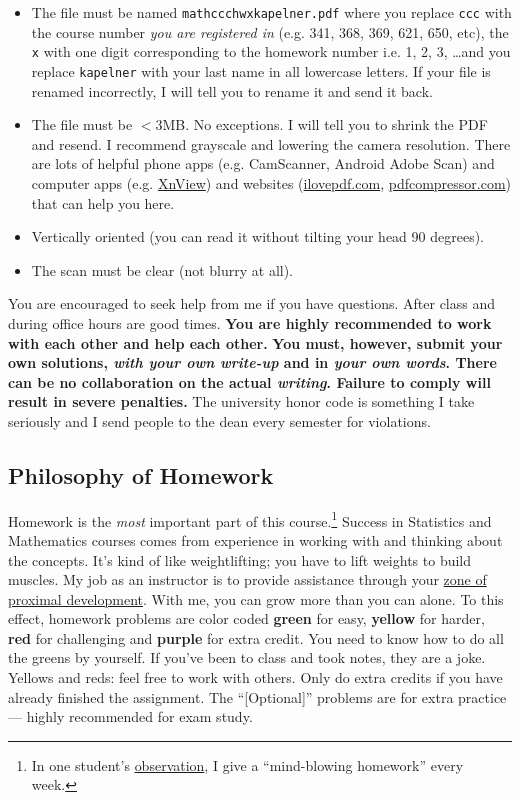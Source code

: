 \documentclass[12pt]{article}
\newcommand{\ingreen}[1]{\color{green}\textbf{#1} \color{black}}
\newcommand{\inyellow}[1]{\color{yellow}\textbf{#1} \color{black}}
\newcommand{\inred}[1]{\color{red}\textbf{#1} \color{black}}
\newcommand{\inpurple}[1]{\color{purple}\textbf{#1} \color{black}}
\newcommand{\pdfcompressiontext}{I recommend  grayscale and lowering the camera resolution. There are lots of helpful phone apps (e.g. CamScanner, Android Adobe Scan) and computer apps (e.g. \href{http://www.xnconvert.com/downloads}{XnView})  and websites (\url{ilovepdf.com}, \url{pdfcompressor.com}) that can help you here.}
\newcommand{\qu}[1]{``#1''}
\begin{document}
\begin{itemize}
\item The file must be named \texttt{mathccchwxkapelner.pdf} where you replace \texttt{ccc} with the course number \emph{you are registered in} (e.g. 341, 368, 369, 621, 650, etc), the \texttt{x} with one digit corresponding to the homework number i.e. 1, 2, 3, \ldots and you replace \texttt{kapelner} with your last name in all lowercase letters. If your file is renamed incorrectly, I will tell you to rename it and send it back.
\item The file must be $<$3MB. No exceptions. I will tell you to shrink the PDF and resend. \pdfcompressiontext
\item Vertically oriented (you can read it without tilting your head 90 degrees).
\item The scan must be clear (not blurry at all).
\end{itemize}

You are encouraged to seek help from me if you have questions. After class and during office hours are good times. \ingreen{You are highly recommended to work with each other and help each other.} \inred{You must, however, submit your own solutions, \textit{with your own write-up} and in \textit{your own words}. There can be no collaboration on the actual \textit{writing}. Failure to comply will result in severe penalties.} The university honor code is something I take seriously and I send people to the dean every semester for violations.


\subsection*{Philosophy of Homework}


Homework is the \textit{most} important part of this course.\footnote{In one student's \href{http://www.ratemyprofessors.com/ShowRatings.jsp?tid=1951051}{observation}, I give a \qu{mind-blowing homework} every week.} Success in Statistics and Mathematics courses comes from experience in working with and thinking about the concepts. It's kind of like weightlifting; you have to lift weights to build muscles. My job as an instructor is to provide assistance through your \href{http://en.wikipedia.org/wiki/Zone_of_proximal_development}{zone of proximal development}. With me, you can grow more than you can alone. To this effect, homework problems are color coded \ingreen{green} for easy, \inyellow{yellow} for harder, \inred{red} for challenging and \inpurple{purple} for extra credit. You need to know how to do all the greens by yourself. If you've been to class and took notes, they are a joke. Yellows and reds: feel free to work with others. Only do extra credits if you have already finished the assignment. The \qu{[Optional]} problems are for extra practice --- highly recommended for exam study.
\end{document}
